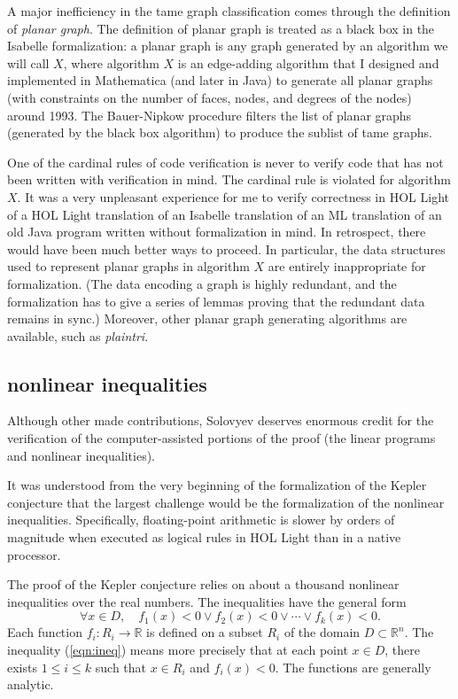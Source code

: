 \documentclass{amsart}
\newcommand{\ring}[1]{\mathbb{#1}}
\begin{document}
A major inefficiency in the tame graph classification comes through
the definition of \emph{planar graph}.  The definition of planar graph
is treated as a black box in the Isabelle formalization: a planar
graph is any graph generated by an algorithm we will call $X$, where
algorithm $X$ is an edge-adding algorithm that I designed and
implemented in Mathematica (and later in Java) to generate all planar
graphs (with constraints on the number of faces, nodes, and degrees of
the nodes) around 1993.  The Bauer-Nipkow procedure filters the list
of planar graphs (generated by the black box algorithm) to produce the
sublist of tame graphs.

One of the cardinal rules of code verification is never
to verify code that has not been written with verification in mind.
The cardinal rule is violated for algorithm $X$.  It was a very
unpleasant experience for me to verify correctness in HOL Light of a
HOL Light translation of an Isabelle translation of an ML translation
of an old Java program written without formalization in mind.  In
retrospect, there would have been much better ways to proceed.  In
particular, the data structures used to represent planar graphs in
algorithm $X$ are entirely inappropriate for formalization.  (The data
encoding a graph is highly redundant, and the formalization has to
give a series of lemmas proving that the redundant data remains
in sync.)  Moreover, other planar graph generating algorithms
are available, such as \emph{plaintri}.

\subsection{nonlinear inequalities}
Although other made contributions, Solovyev deserves enormous
credit for the verification of the computer-assisted portions of the
proof (the linear programs and nonlinear inequalities).

It was understood from the very beginning of the formalization of the
Kepler conjecture that the largest challenge would be the
formalization of the nonlinear inequalities.  Specifically,
floating-point arithmetic is slower by orders of magnitude when
executed as logical rules in HOL Light than in a native processor.

The proof of the Kepler conjecture relies on about a thousand
nonlinear inequalities over the real numbers.  The inequalities
have the general form 
\begin{equation}\label{eqn:ineq}
\forall x \in D,\quad f_1(x) < 0 \lor f_2(x) < 0 \lor \cdots \lor f_k(x) < 0.
\end{equation}
Each function $f_i : R_i \to \ring{R}$ is defined on a subset $R_i$ of the
domain $D\subset \ring{R}^n$.
The inequality (\ref{eqn:ineq}) means more precisely that 
at each point $x\in D$, there exists $1\le i\le k$ such that
$x \in R_i$ and $f_i(x) < 0$.  The functions are generally analytic.
\end{document}
